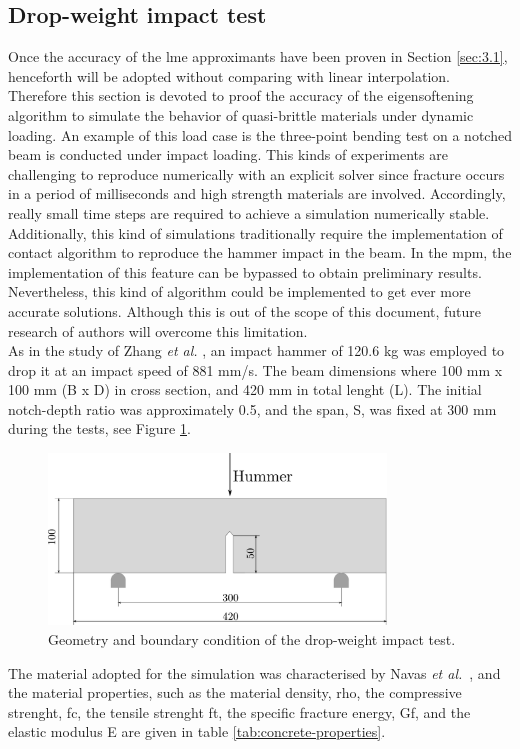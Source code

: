 \message{ !name(2020_EFM_MPM_Eigensoftening.tex)}\documentclass[preprint,12pt,a4paper]{elsarticle}
\begin{document}
\subsection{Drop-weight impact test}
\label{sec:3.2}

Once the accuracy of the \acrshort{lme} approximants have been proven
in Section \ref{sec:3.1}, henceforth will be adopted without comparing
with linear interpolation. Therefore this section is devoted to proof
the accuracy of the eigensoftening algorithm to simulate the behavior
of quasi-brittle materials under dynamic loading. An example of this
load case is the three-point bending test on a notched beam is
conducted under impact loading. This kinds of experiments are
challenging to reproduce numerically with an explicit solver since
fracture occurs in a period of milliseconds and high strength
materials are involved. Accordingly, really small time steps are
required to achieve a simulation numerically stable. Additionally,
this kind of simulations traditionally require the implementation of
contact algorithm to reproduce the hammer impact in the beam. In the
\acrshort{mpm}, the implementation of this feature can be bypassed to
obtain preliminary results. Nevertheless, this kind of algorithm could
be implemented to get ever more accurate solutions. Although this is
out of the scope of this document, future research of authors will overcome this
limitation.\\

As in the study of Zhang {\it et al.} \cite{Zhang_2009,Zhang_2010a},
an impact hammer of 120.6 kg was employed to drop it at an impact
speed of 881 mm/s. The beam dimensions where 100 mm x 100 mm (B x D)
in cross section, and 420 mm in total lenght (L). The initial
notch-depth ratio was approximately 0.5, and the span, S, was fixed at
300 mm during the tests, see Figure
\ref{fig:geometry-drop-weight-impact-test}.
\begin{figure}
  \centering
  \includegraphics[width=0.8\textwidth]{./Figure-impact-test}
  \caption{Geometry and boundary condition of the drop-weight impact test.}
  \label{fig:geometry-drop-weight-impact-test}
\end{figure}
The material adopted for the simulation was characterised by Navas
{\it et al.}~\cite{Navas_2017_ES}, and the material properties, such
as the material density, \gls{rho}, the compressive strenght, \gls{fc},
the tensile strenght \gls{ft}, the specific fracture energy, \gls{Gf},
and the elastic modulus \gls{E} are given in table \ref{tab:concrete-properties}.\\
\end{document}
